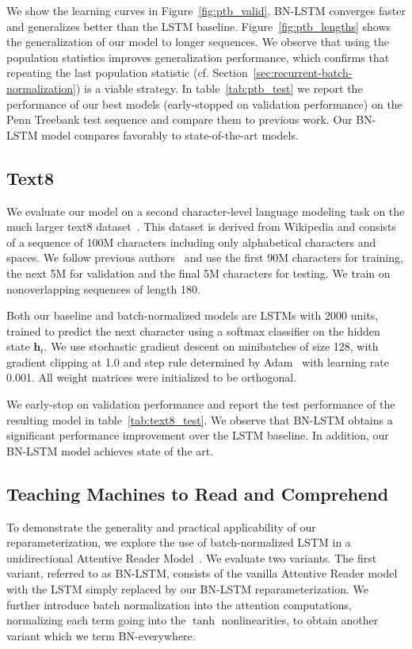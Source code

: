 \documentclass{article} %
\newcommand{\vect}[1]{\mathbf{#1}}
\begin{document}
We show the learning curves in Figure~\ref{fig:ptb_valid}.
BN-LSTM converges faster and generalizes better than the LSTM baseline.
Figure~\ref{fig:ptb_lengths} shows the generalization of our model to longer sequences.
We observe that using the population statistics improves generalization performance,
which confirms that repeating the last population statistic (cf. Section~\ref{sec:recurrent-batch-normalization})
is a viable strategy.
In table~\ref{tab:ptb_test} we report the performance of our best models (early-stopped on validation performance)
on the Penn Treebank test sequence and compare them to previous work.
Our BN-LSTM model compares favorably to state-of-the-art models.

\subsection{Text8}

We evaluate our model on a second character-level language modeling task on the much larger text8 dataset~\cite{mahoney2009large}.
This dataset is derived from Wikipedia and consists of a sequence of 100M characters including only alphabetical characters and spaces.
We follow previous authors~\cite{mikolov2012subword,zhang2016architectural} and use the first 90M characters for training, the next 5M for validation and the final 5M characters for testing.
We train on nonoverlapping sequences of length 180.

Both our baseline and batch-normalized models are LSTMs with 2000 units, trained to predict the next character using a softmax classifier
on the hidden state $\vect{h}_t$. We use stochastic gradient descent on minibatches of size 128,
with gradient clipping at 1.0 and step rule determined by Adam~\cite{kingma2014adam}
with learning rate 0.001.
All weight matrices were initialized to be orthogonal.

We early-stop on validation performance and report the test performance of the resulting model in table~\ref{tab:text8_test}.
We observe that BN-LSTM obtains a significant performance improvement over the LSTM baseline. In addition, our BN-LSTM  model achieves state of the art.

\subsection{Teaching Machines to Read and Comprehend}

To demonstrate the generality and practical applicability of our reparameterization,
we explore the use of batch-normalized LSTM in a unidirectional Attentive Reader Model~\cite{attentivereader}.
We evaluate two variants.
The first variant, referred to as BN-LSTM, consists of the vanilla Attentive Reader model with the LSTM simply replaced by our BN-LSTM reparameterization.
We further introduce batch normalization into the attention computations, normalizing each term going into the $\tanh$ nonlinearities, to obtain another variant which we term BN-everywhere.
\end{document}
